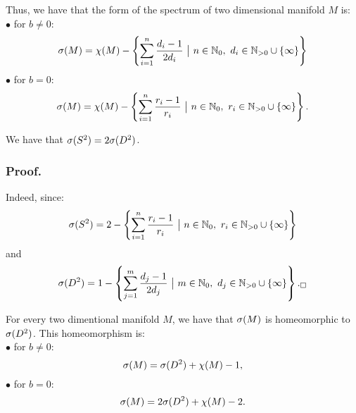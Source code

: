 Thus, we have that the form of the spectrum of two dimensional manifold $M$ is:\\
$\bullet$ for $b\neq 0$: 
\begin{equation}
\spe(M) = \chi(M) - \left\{\sum\limits_{i=1}^n\frac{d_i-1}{2d_i}\ 
\big|\ n\in\mathbb{N}_0,\ d_i\in\mathbb{N}_{>0}\cup \{\infty\}\right\}
\end{equation}
$\bullet$ for $b = 0$:
\begin{equation}
\spe(M) = \chi(M) - \left\{\sum\limits_{i=1}^n \frac{r_i-1}{r_i}\ \big|\ n\in\mathbb{N}_0,\ 
r_i\in\mathbb{N}_{>0}\cup \{\infty\}\right\}.
\end{equation} 
\label{two dim manifold spectrum}


\begin{observation}\label{2times homeomorphism}
We have that ${{\sigma}(S^2)} = 2{{\sigma}(D^2)}$.
\end{observation}
\subsubsection{Proof.}

Indeed, since: 
\begin{align}
\spe(S^2) = 2 -\left\{\sum\limits_{i=1}^n \frac{r_i-1}{r_i}\ \big|\ n\in\mathbb{N}_0,\ 
r_i\in\mathbb{N}_{>0}\cup \{\infty\}\right\}
\end{align}
and 
\begin{align}
\spe(D^2) = 1 - \left\{\sum\limits_{j=1}^m\frac{d_j-1}{2d_j}\ 
\big|\ m\in\mathbb{N}_0,\ d_j\in\mathbb{N}_{>0}\cup \{\infty\}\right\}._\square
\end{align}

\begin{observation}\label{all_spectra_are_isomorphic}\label{spe_M}
For every two dimentional manifold $M$, we have that ${\sigma}(M)$ is homeomorphic to ${{\sigma}(D^2)}$. 
This homeomorphism is: \\
$\bullet$ for $b \neq 0$:
\begin{equation}
{\sigma}(M) = {{\sigma}(D^2)} + \chi(M) - 1, 
\end{equation}
$\bullet$ for $b = 0$:
\begin{equation}
{\sigma}(M) = 2{{\sigma}(D^2)} + \chi(M) - 2.
\end{equation}  
\end{observation}


